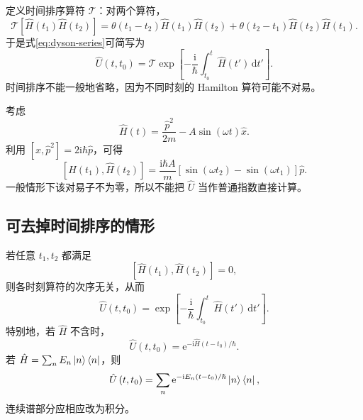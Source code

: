 定义时间排序算符 $\mathcal T$：对两个算符，
\begin{equation}
\mathcal T\left[\hat H\left(t_1\right)\hat H\left(t_2\right)\right]
=\theta\left(t_1-t_2\right)\hat H\left(t_1\right)\hat H\left(t_2\right)
+\theta\left(t_2-t_1\right)\hat H\left(t_2\right)\hat H\left(t_1\right).
\end{equation}
于是式\eqref{eq:dyson-series}可简写为
\begin{equation}
\boxed{\hat U\left(t,t_0\right)=
\mathcal T\exp\left[-\frac{\mathrm{i}}{\hbar}
\int_{t_0}^{t}\hat H\left(t'\right)\,\mathrm{d}t'\right].}
\label{eq:time-ordered-U}
\end{equation}
时间排序不能一般地省略，因为不同时刻的 Hamilton 算符可能不对易。

\begin{example}
考虑
\begin{equation}
\hat H\left(t\right)=\frac{\hat p^2}{2m}-A\sin\left(\omega t\right)\hat x.
\end{equation}
利用 $\left[\hat x,\hat p^2\right]=2\mathrm{i}\hbar\hat p$，可得
\begin{equation}
\left[\hat H\left(t_1\right),\hat H\left(t_2\right)\right]
=\frac{\mathrm{i}\hbar A}{m}
\left[\sin\left(\omega t_2\right)-\sin\left(\omega t_1\right)\right]\hat p.
\end{equation}
一般情形下该对易子不为零，所以不能把 $\hat U$ 当作普通指数直接计算。
\end{example}

\subsection{可去掉时间排序的情形}
若任意 $t_1,t_2$ 都满足
\begin{equation}
\left[\hat H\left(t_1\right),\hat H\left(t_2\right)\right]=0,
\end{equation}
则各时刻算符的次序无关，从而
\begin{equation}
\hat U\left(t,t_0\right)=
\exp\left[-\frac{\mathrm{i}}{\hbar}\int_{t_0}^{t}\hat H\left(t'\right)\,\mathrm{d}t'\right].
\end{equation}
特别地，若 $\hat H$ 不含时，
\begin{equation}
\boxed{\hat U\left(t,t_0\right)=
\mathrm{e}^{-\mathrm{i}\hat H\left(t-t_0\right)/\hbar}.}
\end{equation}
若 $\hat H=\sum_n E_n\Ket{n}\Bra{n}$，则
\begin{equation}
\hat U\left(t,t_0\right)=
\sum_n\mathrm{e}^{-\mathrm{i}E_n\left(t-t_0\right)/\hbar}\Ket{n}\Bra{n},
\end{equation}
连续谱部分应相应改为积分。
